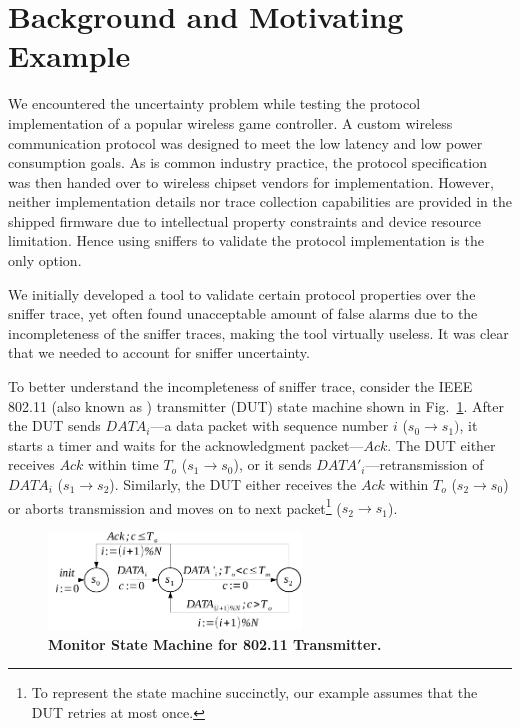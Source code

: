 \section{Background and Motivating Example}
\label{sec:motivation}

We encountered the uncertainty problem while testing the protocol implementation
of a popular wireless game controller. A custom wireless communication protocol
was designed to meet the low latency and low power consumption goals. As is
common industry practice, the protocol specification was then handed over to
wireless chipset vendors for implementation. However, neither implementation
details nor trace collection capabilities are provided in the shipped firmware
due to intellectual property constraints and device resource limitation. Hence
using sniffers to validate the protocol implementation is the only option.

We initially developed a tool to validate certain protocol properties over the
sniffer trace, yet often found unacceptable amount of false alarms due to
the incompleteness of the sniffer traces, making the tool virtually useless. It
was clear that we needed to account for sniffer uncertainty.

To better understand the incompleteness of sniffer trace, consider the IEEE
802.11 (also known as \wifi{}) transmitter (DUT) state machine shown in
Fig.~\ref{fig:dot11_tx_ta}. After the DUT sends $DATA_i$---a data packet with
sequence number $i$ ($s_0\rightarrow s_1)$, it starts a timer and waits for the
acknowledgment packet---$Ack$. The DUT either receives $Ack$ within time $T_o$
($s_1\rightarrow s_0$), or it sends $DATA'_i$---retransmission of $DATA_i$
($s_1\rightarrow s_2$). Similarly, the DUT either receives the $Ack$ within $T_o$
($s_2\rightarrow s_0$) or aborts transmission and moves on to next
packet\footnote{To represent the state machine succinctly, our example assumes
that the DUT retries at most once.} ($s_2\rightarrow s_1$).

\begin{figure}[H]
  \centering
  \includegraphics[width=0.6\textwidth]{./figures/dot11_tx_ta.pdf}
  \caption{\textbf{Monitor State Machine for 802.11 Transmitter.}}
  \label{fig:dot11_tx_ta}
  \vspace*{-5mm}
\end{figure}

